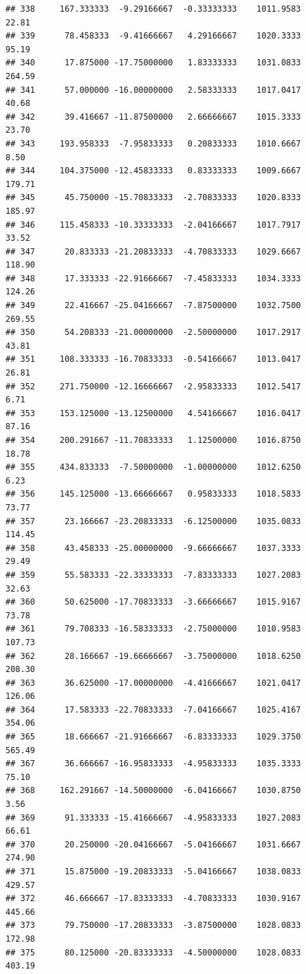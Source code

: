\documentclass[
]{article}
\begin{document}
\begin{verbatim}
## 338     167.333333  -9.29166667  -0.33333333    1011.9583       22.81
## 339      78.458333  -9.41666667   4.29166667    1020.3333       95.19
## 340      17.875000 -17.75000000   1.83333333    1031.0833      264.59
## 341      57.000000 -16.00000000   2.58333333    1017.0417       40.68
## 342      39.416667 -11.87500000   2.66666667    1015.3333       23.70
## 343     193.958333  -7.95833333   0.20833333    1010.6667        8.50
## 344     104.375000 -12.45833333   0.83333333    1009.6667      179.71
## 345      45.750000 -15.70833333  -2.70833333    1020.8333      185.97
## 346     115.458333 -10.33333333  -2.04166667    1017.7917       33.52
## 347      20.833333 -21.20833333  -4.70833333    1029.6667      118.90
## 348      17.333333 -22.91666667  -7.45833333    1034.3333      124.26
## 349      22.416667 -25.04166667  -7.87500000    1032.7500      269.55
## 350      54.208333 -21.00000000  -2.50000000    1017.2917       43.81
## 351     108.333333 -16.70833333  -0.54166667    1013.0417       26.81
## 352     271.750000 -12.16666667  -2.95833333    1012.5417        6.71
## 353     153.125000 -13.12500000   4.54166667    1016.0417       87.16
## 354     200.291667 -11.70833333   1.12500000    1016.8750       18.78
## 355     434.833333  -7.50000000  -1.00000000    1012.6250        6.23
## 356     145.125000 -13.66666667   0.95833333    1018.5833       73.77
## 357      23.166667 -23.20833333  -6.12500000    1035.0833      114.45
## 358      43.458333 -25.00000000  -9.66666667    1037.3333       29.49
## 359      55.583333 -22.33333333  -7.83333333    1027.2083       32.63
## 360      50.625000 -17.70833333  -3.66666667    1015.9167       73.78
## 361      79.708333 -16.58333333  -2.75000000    1010.9583      107.73
## 362      28.166667 -19.66666667  -3.75000000    1018.6250      208.30
## 363      36.625000 -17.00000000  -4.41666667    1021.0417      126.06
## 364      17.583333 -22.70833333  -7.04166667    1025.4167      354.06
## 365      18.666667 -21.91666667  -6.83333333    1029.3750      565.49
## 367      36.666667 -16.95833333  -4.95833333    1035.3333       75.10
## 368     162.291667 -14.50000000  -6.04166667    1030.8750        3.56
## 369      91.333333 -15.41666667  -4.95833333    1027.2083       66.61
## 370      20.250000 -20.04166667  -5.04166667    1031.6667      274.90
## 371      15.875000 -19.20833333  -5.04166667    1038.0833      429.57
## 372      46.666667 -17.83333333  -4.70833333    1030.9167      445.66
## 373      79.750000 -17.20833333  -3.87500000    1028.0833      172.98
## 375      80.125000 -20.83333333  -4.50000000    1028.0833      403.19

\end{verbatim}
\end{document}
